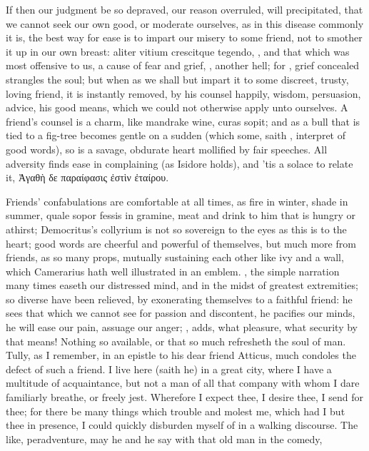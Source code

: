 {If then our judgment be so depraved, our reason overruled, will
precipitated, that we cannot seek our own good, or moderate ourselves,
as in this disease commonly it is, the best way for ease is to impart
our misery to some friend, not to smother it up in our own breast:
aliter vitium crescitque tegendo, \etc{}, and that which was most
offensive to us, a cause of fear and grief, ,
another hell; for  , grief concealed strangles the soul; but when as we shall but
impart it to some discreet, trusty, loving friend, it is
instantly removed, by his counsel happily, wisdom, persuasion,
advice, his good means, which we could not otherwise apply unto
ourselves. A friend's counsel is a charm, like mandrake wine, curas
sopit; and as a bull that is tied to a fig-tree becomes gentle on
a sudden (which some, saith \Plutarch, interpret of good words),
so is a savage, obdurate heart mollified by fair speeches. All
adversity finds ease in complaining (as Isidore holds), and 'tis
a solace to relate it, \textgreek{Ἀγαθὴ δε παραίφασις ἐστὶν ἐταίρου}.

Friends' confabulations are comfortable at all times, as fire in
winter, shade in summer, quale sopor fessis in gramine, meat and drink
to him that is hungry or athirst; Democritus's collyrium is not so
sovereign to the eyes as this is to the heart; good words are cheerful
and powerful of themselves, but much more from friends, as so many
props, mutually sustaining each other like ivy and a wall, which
Camerarius hath well illustrated in an emblem. , the simple narration many times easeth our distressed
mind, and in the midst of greatest extremities; so diverse have been
relieved, by exonerating themselves to a faithful friend: he sees
that which we cannot see for passion and discontent, he pacifies our
minds, he will ease our pain, assuage our anger; , \Chrysostom adds, what pleasure, what security by that
means! Nothing so available, or that so much refresheth the soul
of man. Tully, as I remember, in an epistle to his dear friend Atticus,
much condoles the defect of such a friend. I live here (saith he)
in a great city, where I have a multitude of acquaintance, but not a
man of all that company with whom I dare familiarly breathe, or freely
jest. Wherefore I expect thee, I desire thee, I send for thee; for
there be many things which trouble and molest me, which had I but thee
in presence, I could quickly disburden myself of in a walking
discourse. The like, peradventure, may he and he say with that old man
in the comedy,

}
